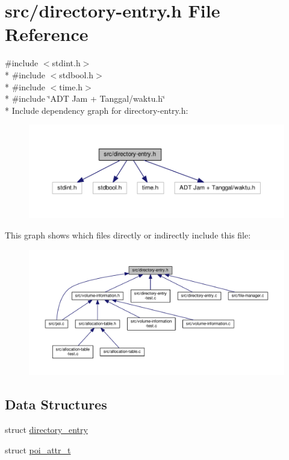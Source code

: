 \hypertarget{directory-entry_8h}{\section{src/directory-\/entry.h File Reference}
\label{directory-entry_8h}
}
{\ttfamily \#include $<$stdint.\-h$>$}\\*
{\ttfamily \#include $<$stdbool.\-h$>$}\\*
{\ttfamily \#include $<$time.\-h$>$}\\*
{\ttfamily \#include \char`\"{}A\-D\-T Jam + Tanggal/waktu.\-h\char`\"{}}\\*
Include dependency graph for directory-\/entry.h\-:
\nopagebreak
\begin{figure}[H]
\begin{center}
\leavevmode
\includegraphics[width=350pt]{directory-entry_8h__incl}
\end{center}
\end{figure}
This graph shows which files directly or indirectly include this file\-:
\nopagebreak
\begin{figure}[H]
\begin{center}
\leavevmode
\includegraphics[width=350pt]{directory-entry_8h__dep__incl}
\end{center}
\end{figure}
\subsection*{Data Structures}
\begin{DoxyCompactItemize}
\item 
struct \hyperlink{structdirectory__entry}{directory\-\_\-entry}
\item 
struct \hyperlink{structpoi__attr__t}{poi\-\_\-attr\-\_\-t}
\end{DoxyCompactItemize}
